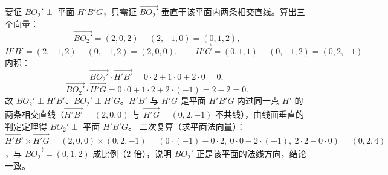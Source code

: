 \begin{answer}
要证 $BO_2'\perp$ 平面 $H'B'G$，只需证 $\overrightarrow{BO_2'}$ 垂直于该平面内两条相交直线。算出三个向量：
\nopagebreak[4]
\[
\overrightarrow{BO_2'}=(2,0,2)-(2,-1,0)=(0,1,2),
\]
\nopagebreak[4]
\[
\overrightarrow{H'B'}=(2,-1,2)-(0,-1,2)=(2,0,0),\qquad
\overrightarrow{H'G}=(0,1,1)-(0,-1,2)=(0,2,-1).
\]
内积：
\nopagebreak[4]
\[
\overrightarrow{BO_2'}\cdot\overrightarrow{H'B'}=0\cdot2+1\cdot0+2\cdot0=0,
\]
\nopagebreak[4]
\[
\overrightarrow{BO_2'}\cdot\overrightarrow{H'G}=0\cdot0+1\cdot2+2\cdot(-1)=2-2=0.
\]
故 $BO_2'\perp H'B'$、$BO_2'\perp H'G$。$H'B'$ 与 $H'G$ 是平面 $H'B'G$ 内过同一点 $H'$ 的两条相交直线（$\overrightarrow{H'B'}=(2,0,0)$ 与 $\overrightarrow{H'G}=(0,2,-1)$ 不共线），由线面垂直的判定定理得 $BO_2'\perp$ 平面 $H'B'G$。
二次复算（求平面法向量）：$\overrightarrow{H'B'}\times\overrightarrow{H'G}=(2,0,0)\times(0,2,-1)=(0\cdot(-1)-0\cdot2,\ 0\cdot0-2\cdot(-1),\ 2\cdot2-0\cdot0)=(0,2,4)$，与 $\overrightarrow{BO_2'}=(0,1,2)$ 成比例（$2$ 倍），说明 $BO_2'$ 正是该平面的法线方向，结论一致。



\end{answer}
